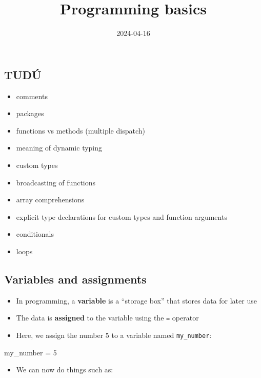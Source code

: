 \documentclass[
  letterpaper,
  DIV=11,
  numbers=noendperiod]{scrartcl}
\title{Programming basics}
\author{}
\date{2024-04-16}
\newenvironment{Shaded}{\begin{snugshade}}{\end{snugshade}}
\newcommand{\FloatTok}[1]{\textcolor[rgb]{0.68,0.00,0.00}{#1}}
\newcommand{\NormalTok}[1]{\textcolor[rgb]{0.00,0.23,0.31}{#1}}
\newcommand{\OperatorTok}[1]{\textcolor[rgb]{0.37,0.37,0.37}{#1}}
\providecommand{\tightlist}{%
  \setlength{\itemsep}{0pt}\setlength{\parskip}{0pt}}\usepackage{longtable,booktabs,array}
\begin{document}
\maketitle

\subsection{TUDÚ}\label{tuduxfa}

\begin{itemize}
\tightlist
\item
  comments
\item
  packages
\item
  functions vs methods (multiple dispatch)
\item
  meaning of dynamic typing
\item
  custom types
\item
  broadcasting of functions
\item
  array comprehensions
\item
  explicit type declarations for custom types and function arguments
\item
  conditionals
\item
  loops
\end{itemize}

\subsection{Variables and assignments}\label{variables-and-assignments}

\begin{itemize}
\tightlist
\item
  In programming, a \textbf{variable} is a ``storage box'' that stores
  data for later use
\item
  The data is \textbf{assigned} to the variable using the \texttt{=}
  operator
\item
  Here, we assign the number 5 to a variable named \texttt{my\_number}:
\end{itemize}

\begin{Shaded}
\begin{Highlighting}[]
\NormalTok{my\_number }\OperatorTok{=} \FloatTok{5}
\end{Highlighting}
\end{Shaded}

\begin{itemize}
\tightlist
\item
  We can now do things such as:
\end{itemize}
\end{document}
